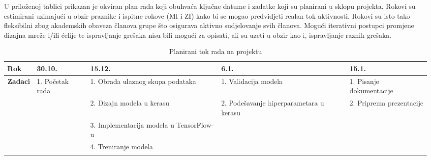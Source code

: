 \documentclass{report}
\begin{document}
U priloženoj tablici prikazan je okviran plan rada koji obuhvaća ključne datume i zadatke koji su planirani u sklopu projekta. Rokovi su estimirani uzimajući u obzir praznike i ispitne rokove (MI i ZI) kako bi se mogao predvidjeti realan tok aktivnosti. Rokovi su isto tako fleksibilni zbog akademskih obaveza članova grupe što osigurava aktivno sudjelovanje svih članova. Mogući iterativni postupci promjene dizajna mreže i/ili ćelije te ispravljanje grešaka nisu bili mogući za opisati, ali su uzeti u obzir kao i, ispravljanje raznih grešaka.

\begin{longtable}{|p{35pt}|p{90pt}|p{90pt}|p{90pt}|p{90pt}|}
\hline
\textbf{Rok} & \textbf{30.10.} & \textbf{15.12.} & \textbf{6.1.} & \textbf{15.1.} \\
\hline
\multirow{5}{*}{\textbf{Zadaci}} 
                   & 1. Početak rada & 1. Obrada ulaznog skupa podataka & 1. Validacija modela & 1. Pisanje dokumentacije \\
                   & & 2. Dizajn modela u kerasu & 2. Podešavanje hiperparametara u kerasu & 2. Priprema prezentacije \\
                   & & 3. Implementacija modela u TensorFlow-u & & \\
                   & & 4. Treniranje modela & & \\
\hline

\caption{Planirani tok rada na projektu}
\end{longtable}
\end{document}
